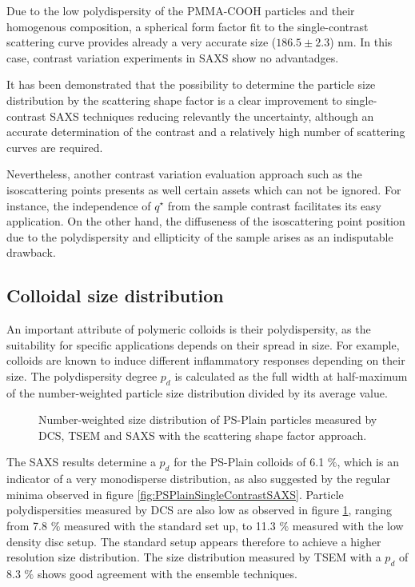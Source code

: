 Due to the low polydispersity of the PMMA-COOH particles and their homogenous composition, a spherical form factor fit to the single-contrast scattering curve provides already a very accurate size ($186.5\pm2.3$) nm. In this case, contrast variation experiments in SAXS show no advantadges.

It has been demonstrated that the possibility to determine the particle size distribution by the scattering shape factor is a clear improvement to single-contrast SAXS techniques reducing relevantly the uncertainty, although an accurate determination of the contrast and a relatively high number of scattering curves are required. 

Nevertheless, another contrast variation evaluation approach such as the isoscattering points presents as well certain assets which can not be ignored. For instance, the independence of $q^{\star}$ from the sample contrast facilitates its easy application. On the other hand, the diffuseness of the isoscattering point position due to the polydispersity and ellipticity of the sample\citep{kawaguchi_isoscattering_1992} arises as an indisputable drawback.

\subsection{Colloidal size distribution}

An important attribute of polymeric colloids is their polydispersity, as the suitability for specific applications depends on their spread in size. For example, colloids are known to induce different inflammatory responses depending on their size\citep{kusaka_effect_2014}. The polydispersity degree $p_d$ is calculated as the full width at half-maximum of the number-weighted particle size distribution divided by its average value.

\begin{figure}
	\begin{center}
		
	\end{center}
	\caption{Number-weighted size distribution of PS-Plain particles measured by DCS, TSEM \citep{nicolet_inter-laboratory_2016} and SAXS with the scattering shape factor approach.}
	\label{fig:PSPlainSizeDistribution}
\end{figure}

The SAXS results determine a $p_d$ for the PS-Plain colloids of 6.1 $\%$, which is an indicator of a very monodisperse distribution, as also suggested by the regular minima observed in figure \ref{fig:PSPlainSingleContrastSAXS}. Particle polydispersities measured by DCS are also low as observed in figure \ref{fig:PSPlainSizeDistribution}, ranging from 7.8 $\%$ measured with the standard set up, to 11.3 $\%$ measured with the low density disc setup. The standard setup appears therefore to achieve a higher resolution size distribution. The size distribution measured by TSEM with a $p_d$ of 8.3 $\%$ shows good agreement with the ensemble techniques.

